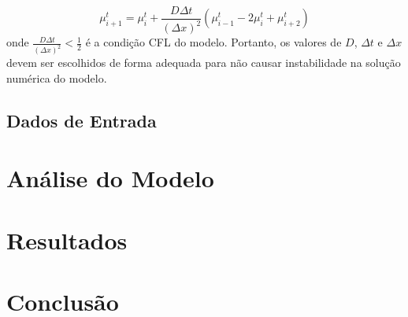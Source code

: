 \documentclass{article}
\begin{document}
\begin{equation}
	\mu_{i+1}^t = \mu_i^t + \frac{D \Delta t}{(\Delta x)^2} \left( \mu_{i-1}^t - 2\mu_i^t + \mu_{i+2}^{t}  \right)
\end{equation}
onde $\frac{D\Delta t}{(\Delta x)^2} < \frac{1}{2}$ é a condição CFL do modelo. Portanto, os valores de $D$, $\Delta t$ e $\Delta x$ devem ser escolhidos de forma adequada para não causar instabilidade na solução numérica do modelo.

\subsection{Dados de Entrada}

\section{Análise do Modelo}

\section{Resultados}

\section{Conclusão}





\end{document}
